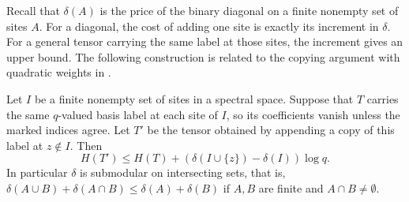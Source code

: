 Recall that $\delta(A)$ is the price of the binary diagonal on a finite
nonempty set of sites $A$. For a diagonal, the cost of adding one
site is exactly its increment in $\delta$. For a general tensor
carrying the same label at those sites, the increment gives an upper
bound. The following construction is related to the copying argument
with quadratic weights in \cite[Proposition~3.1]{nine}.

\begin{proposition}\label{lem:submod}
Let $I$ be a finite nonempty set of sites in a spectral space.
Suppose that $T$ carries the same $q$-valued basis label at each site
of $I$, so its coefficients vanish unless the marked indices agree.
Let $T'$ be the tensor obtained by appending a copy of this label at
$z\notin I$. Then
\[
 H(T')\le H(T)+(\delta(I\cup\{z\})-\delta(I))\log q.
\]
In particular $\delta$ is submodular on intersecting sets, that is,
$\delta(A\cup B)+\delta(A\cap B)\leq\delta(A)+\delta(B)$ if $A,B$ are finite and $A\cap B\ne\emptyset$.
\end{proposition}

